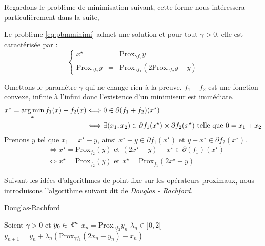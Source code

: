 \documentclass[a4paper,12pt]{article}
\newcommand{\prox}{\text{Prox}}
\begin{document}
Regardons le problème de minimisation suivant, cette forme nous intéressera particulièrement dans la suite, \\


\begin{propriete}
Le problème \ref{eq:pbmminimi} admet une solution et pour tout $\gamma >0$, elle est caractérisée par :
$$
\left\{
\begin{array}{rcl}
x^{\star} &= & \prox_{\gamma f_2} y \\
\prox_{\gamma f_2}y &= & \prox_{\gamma f_1}(2\prox_{\gamma f_2}y -y)
\end{array}
\right.
$$
\end{propriete}

\begin{preuve}
Omettons le paramètre $\gamma$ qui ne change rien à la preuve. $f_1+f_2$ est une fonction convexe, infinie à l'infini donc l'existence d'un minimiseur est immédiate.
\begin{align*}
x^{\star} =\operatorname*{arg\,min}_x f_1(x) + f_2(x) &\Longleftrightarrow 0\in \partial (f_1+f_2)(x^{\star}) \\
&\Longleftrightarrow \exists (x_1,x_2)\in \partial f_1(x^{\star})\times\partial f_2(x^{\star}) \text{ telle que } 0=x_1+x_2
\end{align*}
Prenons  $y$ tel que $x_1=x^{\star} - y$, ainsi $x^{\star}-y\in \partial f_1(x^{\star})$ et $y-x^{\star}\in\partial f_2(x^{\star})$.
\begin{align*}
&\Longleftrightarrow x^{\star} =\prox_{f_2} (y) \text{ et } (2x^{\star}-y)-x^{\star}\in\partial(f_1)(x^{\star})\\
&\Longleftrightarrow x^{\star} =\prox_{f_2} (y) \text{ et } x^{\star}=\prox_{f_1}(2x^{\star}-y)
\end{align*}
\end{preuve}

Suivant les idées d'algorithmes de point fixe sur les opérateurs proximaux, nous introduisons l'algorithme suivant dit de \emph{Douglas - Rachford}.
\begin{algorithm}
\caption{Douglas-Rachford}
\begin{algorithmic}
\STATE Soient $\gamma >0$ et $y_0\in \mathbb{R}^n$
\STATE $x_n = \prox_{\gamma f_2} y_n$
\STATE $\lambda_n \in ]0,2[$
\STATE $y_{n+1} = y_n + \lambda_n(\prox_{\gamma f_1} (2x_n-y_n)-x_n)$
\ENDFOR
\end{algorithmic}
\end{algorithm}
\end{document}
